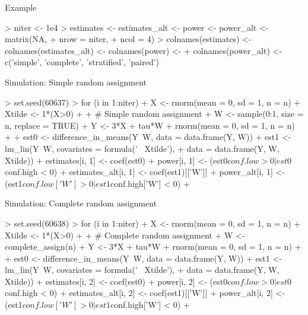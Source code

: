 \documentclass[xcolor={dvipsnames},handout]{beamer}
\begin{document}
\begin{frame}[fragile]{Example}

\scriptsize
\begin{Schunk}
\begin{Sinput}
> niter <- 1e4
> estimates <- estimates_alt <- power <- power_alt <- matrix(NA,
+   nrow = niter,
+   ncol = 4)
> colnames(estimates) <- colnames(estimates_alt) <- colnames(power) <-
+   colnames(power_alt) <- c('simple', 'complete', 'stratified', 'paired')
\end{Sinput}
\end{Schunk}


\end{frame}



\begin{frame}[fragile]{Simulation: Simple random assignment}
\scriptsize
\begin{Schunk}
\begin{Sinput}
> set.seed(60637)
> for (i in 1:niter) {
+   X <- rnorm(mean = 0, sd = 1, n = n)
+   Xtilde <- 1*(X>0)
+
+   # Simple random assignment
+   W <- sample(0:1, size = n, replace = TRUE)
+   Y <- 3*X + tau*W + rnorm(mean = 0, sd = 1, n = n)
+
+   est0 <- difference_in_means(Y~W, data = data.frame(Y, W))
+   est1 <- lm_lin(Y~W, covariates = formula('~ Xtilde'),
+                  data = data.frame(Y, W, Xtilde))
+   estimates[i, 1] <- coef(est0)
+   power[i, 1] <- (est0$conf.low > 0 | est0$conf.high < 0)
+   estimates_alt[i, 1] <- coef(est1)[['W']]
+   power_alt[i, 1] <- (est1$conf.low['W'] > 0 | est1$conf.high['W'] < 0)
+ }
\end{Sinput}
\end{Schunk}
\end{frame}

\begin{frame}[fragile]{Simulation: Complete random assignment}
\scriptsize
\begin{Schunk}
\begin{Sinput}
> set.seed(60638)
> for (i in 1:niter) {
+   X <- rnorm(mean = 0, sd = 1, n = n)
+   Xtilde <- 1*(X>0)
+
+   # Complete random assignment
+   W <- complete_assign(n)
+   Y <- 3*X + tau*W + rnorm(mean = 0, sd = 1, n = n)
+
+   est0 <- difference_in_means(Y~W, data = data.frame(Y, W))
+   est1 <- lm_lin(Y~W, covariates = formula('~ Xtilde'),
+                  data = data.frame(Y, W, Xtilde))
+   estimates[i, 2] <- coef(est0)
+   power[i, 2] <- (est0$conf.low > 0 | est0$conf.high < 0)
+   estimates_alt[i, 2] <- coef(est1)[['W']]
+   power_alt[i, 2] <- (est1$conf.low['W'] > 0 | est1$conf.high['W'] < 0)
+ }
\end{Sinput}
\end{Schunk}
\end{frame}
\end{document}
